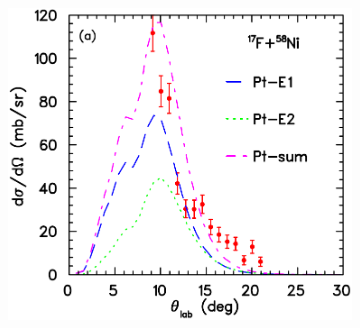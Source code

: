 \documentclass[a4paper,12pt,oneside]{book}
\begin{document}

\begin{figure}[H]
\centering
    \begin{subfigure}[t]{0.45\textwidth}
        \centering
        \includegraphics[scale=0.5, width=.97\columnwidth]{figs/17F_58Ni.png}
        \caption{}
        \label{subfig:dist_ang_2_a}
    \end{subfigure}%
    \hspace{0.5cm}
    \begin{subfigure}[t]{0.45\textwidth}
        \centering

\end{subfigure}
\end{figure}
\end{document}
